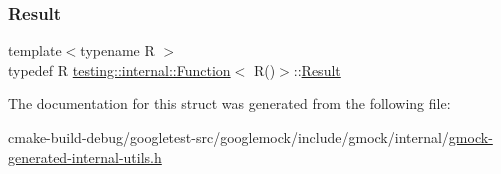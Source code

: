 \mbox{\label{structtesting_1_1internal_1_1Function_3_01R_07_08_4_a5c228a886ef598ac10988f8de5e32ca1}} 
\subsubsection{\texorpdfstring{Result}{Result}}
{\footnotesize\ttfamily template$<$typename R $>$ \\
typedef R \mbox{\hyperlink{structtesting_1_1internal_1_1Function}{testing\+::internal\+::\+Function}}$<$ R()$>$\+::\mbox{\hyperlink{structtesting_1_1internal_1_1Function_3_01R_07_08_4_a5c228a886ef598ac10988f8de5e32ca1}{Result}}}



The documentation for this struct was generated from the following file\+:\begin{DoxyCompactItemize}
\item 
cmake-\/build-\/debug/googletest-\/src/googlemock/include/gmock/internal/\mbox{\hyperlink{gmock-generated-internal-utils_8h}{gmock-\/generated-\/internal-\/utils.\+h}}\end{DoxyCompactItemize}
